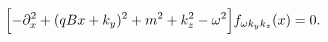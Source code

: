\begin{equation}
\Bigl[- \partial_x^2 + (q Bx + k_y)^2 
 + m^2 + k_z^2 - \omega^2 \Bigr] f_{\omega k_y k_z}(x) = 0. \label{ks osc}
\end{equation}

